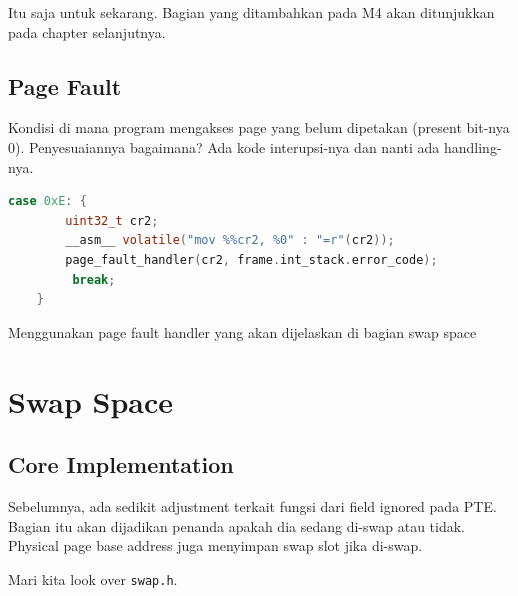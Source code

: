 Itu saja untuk sekarang. Bagian yang ditambahkan pada M4 akan ditunjukkan pada chapter selanjutnya.

\subsection{Page Fault}

Kondisi di mana program mengakses page yang belum dipetakan (present bit-nya 0). Penyesuaiannya bagaimana? Ada kode interupsi-nya dan nanti ada handling-nya.

\begin{lstlisting}[language=c]
    case 0xE: {
        uint32_t cr2;
        __asm__ volatile("mov %%cr2, %0" : "=r"(cr2));
        page_fault_handler(cr2, frame.int_stack.error_code);
         break;
    }
\end{lstlisting}

Menggunakan page fault handler yang akan dijelaskan di bagian swap space

\section{Swap Space}

\subsection{Core Implementation}

Sebelumnya, ada sedikit adjustment terkait fungsi dari field ignored pada PTE. Bagian itu akan dijadikan penanda apakah dia sedang di-swap atau tidak. Physical page base address juga menyimpan swap slot jika di-swap.

Mari kita look over \texttt{swap.h}.

\begin{table}[htbp]
\centering
{}
\end{table}

